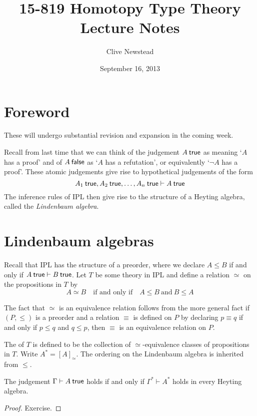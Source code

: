 \documentclass[12pt]{article}
\newenvironment{theorem}[1][Theorem.]{\begin{trivlist}\item[\hskip \labelsep {\bfseries #1}]}{\end{trivlist}}
\newenvironment{definition}[1][Definition.]{\begin{trivlist}\item[\hskip \labelsep {\bfseries #1}]}{\end{trivlist}}
\begin{document}
\title{15-819 Homotopy Type Theory\\ Lecture Notes}
\author{Clive Newstead}
\date{September 16, 2013}

\maketitle

\section*{Foreword}

These will undergo substantial revision and expansion in the coming week.

Recall from last time that we can think of the judgement $A \true$ as meaning `$A$ has a proof' and of $A \postfixjudgment{false}$ as `$A$ has a refutation', or equivalently `$\neg A$ has a proof'. These atomic judgements give rise to hypothetical judgements of the form
$$A_1 \true, A_2 \true, \dots, A_n \true \vdash A \true$$
The inference rules of \acl{IPL} then give rise to the structure of a Heyting algebra, called the \emph{Lindenbaum algebra}.

\section{Lindenbaum algebras}

Recall that \acs{IPL} has the structure of a preorder, where we declare $A \le B$ if and only if $A \true \vdash B \true$. Let $T$ be some theory in \acl{IPL} and define a relation $\simeq$ on the propositions in $T$ by
\begin{equation*}
A \simeq B \quad \text{if and only if} \quad A \le B\ \text{and}\ B \le A
\end{equation*}

The fact that $\simeq$ is an equivalence relation follows from the more general fact if $(P, \le)$ is a preorder and a relation $\equiv$ is defined on $P$ by declaring $p \equiv q$ if and only if $p \le q$ and $q \le p$, then $\equiv$ is an equivalence relation on $P$.

\begin{definition}
The  of $T$ is defined to be the collection of $\simeq$-equivalence classes of propositions in $T$. Write $A^* = [A]_{\simeq}$. The ordering on the Lindenbaum algebra is inherited from $\le$.
\end{definition}

\begin{theorem}
The judgement $\Gamma \vdash A \true$ holds if and only if $\Gamma^* \vdash A^*$ holds in every Heyting algebra.
\end{theorem}
\begin{proof}
Exercise.
\end{proof}
\end{document}
